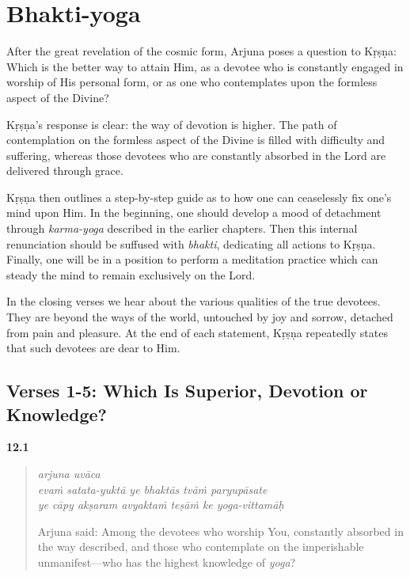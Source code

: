 \chapter{Bhakti-yoga}\label{chap-bhakti-yoga}

\noindent After the great revelation of the cosmic form, Arjuna poses a question to Kṛṣṇa: Which is the better way to attain Him, as a devotee who is constantly engaged in worship of His personal form, or as one who contemplates upon the formless aspect of the Divine?

Kṛṣṇa's response is clear: the way of devotion is higher. The path of contemplation on the formless aspect of the Divine is filled with difficulty and suffering, whereas those devotees who are constantly absorbed in the Lord are delivered through grace.

Kṛṣṇa then outlines a step-by-step guide as to how one can ceaselessly fix one’s mind upon Him. In the beginning, one should develop a mood of detachment through \textit{karma-yoga} described in the earlier chapters. Then this internal renunciation should be suffused with \textit{bhakti}, dedicating all actions to Kṛṣṇa. Finally, one will be in a position to perform a meditation practice which can steady the mind to remain exclusively on the Lord.

In the closing verses we hear about the various qualities of the true devotees. They are beyond the ways of the world, untouched by joy and sorrow, detached from pain and pleasure. At the end of each statement, Kṛṣṇa repeatedly states that such devotees are dear to Him.

\section{Verses 1-5: Which Is Superior, Devotion or Knowledge?}\label{sec-verses-1-5-which-is-superior-devotion-or-knowledge}


\par\noindent\textbf{12.1}\par
\begin{verse}
\textit{arjuna uvāca} \\
\textit{evaṁ satata-yuktā ye bhaktās tvāṁ paryupāsate} \\
\textit{ye cāpy akṣaram avyaktaṁ teṣāṁ ke yoga-vittamāḥ}

\noindent Arjuna said: Among the devotees who worship You, constantly absorbed in the way described, and those who contemplate on the imperishable unmanifest---who has the highest knowledge of \textit{yoga}?
\end{verse}
\par



